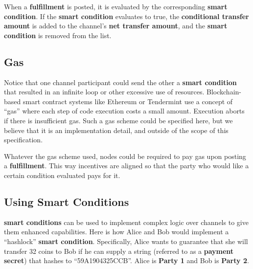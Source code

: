 \documentclass[a4paper]{article}
\newcommand{\bgls}[1]{\textbf{\gls{#1}}}
\newcommand{\bglspl}[1]{\textbf{\glspl{#1}}}
\begin{document}
When a \bgls{fulfillment} is posted, it is evaluated by the corresponding \bgls{smart condition}. If the \bgls{smart condition} evaluates to true, the \bgls{conditional transfer amount} is added to the channel's \bgls{net transfer amount}, and the \bgls{smart condition} is removed from the list.

\subsection{Gas}
Notice that one channel participant could send the other a \bgls{smart condition} that resulted in an infinite loop or other excessive use of resources. Blockchain-based smart contract systems like Ethereum\cite{ethereum} or Tendermint\cite{tendermint} use a concept of ``gas'' where each step of code execution costs a small amount. Execution aborts if there is insufficient gas. Such a gas scheme could be specified here, but we believe that it is an implementation detail, and outside of the scope of this specification.

Whatever the gas scheme used, nodes could be required to pay gas upon posting a \bgls{fulfillment}. This way incentives are aligned so that the party who would like a certain condition evaluated pays for it.

\subsection{Using Smart Conditions}

\bglspl{smart condition} can be used to implement complex logic over channels to give them enhanced capabilities. Here is how Alice and Bob would implement a ``hashlock'' \bgls{smart condition}. Specifically, Alice wants to guarantee that she will transfer 32 coins to Bob if he can supply a string (referred to as a \bgls{payment secret}) that hashes to ``59A1904325CCB''. Alice is \textbf{Party 1} and Bob is \textbf{Party 2}.
\end{document}
